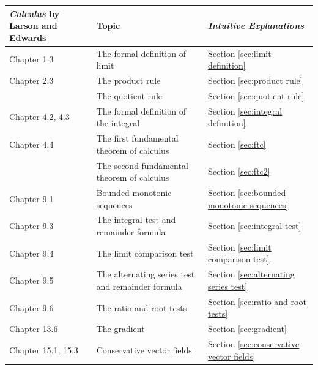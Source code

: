 \documentclass{myarticle}
\theoremstyle{nospace}
\newtheorem{old series theorem}{Theorem}
\newenvironment{series theorem}
{\begin{mdframed}\begin{old series theorem}}
    {\end{old series theorem}\end{mdframed}}
\begin{document}
\begin{longtable}{P{0.2\textwidth}P{0.4\textwidth}P{0.3\textwidth}}
  \toprule

  \textit{Calculus} by Larson and Edwards &
  Topic &
  \textit{Intuitive Explanations} \\

  \midrule

  Chapter 1.3 &
  The formal definition of limit &
  Section \ref{sec:limit definition} \\

  Chapter 2.3 &
  The product rule &
  Section \ref{sec:product rule} \\

  &
  The quotient rule &
  Section \ref{sec:quotient rule} \\

  Chapter 4.2, 4.3 &
  The formal definition of the integral &
  Section \ref{sec:integral definition} \\

  Chapter 4.4 &
  The first fundamental theorem of calculus &
  Section \ref{sec:ftc} \\

  &
  The second fundamental theorem of calculus &
  Section \ref{sec:ftc2} \\

  Chapter 9.1 &
  Bounded monotonic sequences &
  Section \ref{sec:bounded monotonic sequences} \\

  Chapter 9.3 &
  The integral test and remainder formula &
  Section \ref{sec:integral test} \\

  Chapter 9.4 &
  The limit comparison test &
  Section \ref{sec:limit comparison test} \\

  Chapter 9.5 &
  The alternating series test and remainder formula &
  Section \ref{sec:alternating series test} \\

  Chapter 9.6 &
  The ratio and root tests &
  Section \ref{sec:ratio and root tests} \\

  Chapter 13.6 &
  The gradient &
  Section \ref{sec:gradient} \\

  Chapter 15.1, 15.3 &
  Conservative vector fields &
  Section \ref{sec:conservative vector fields} \\


\end{longtable}
\end{document}
